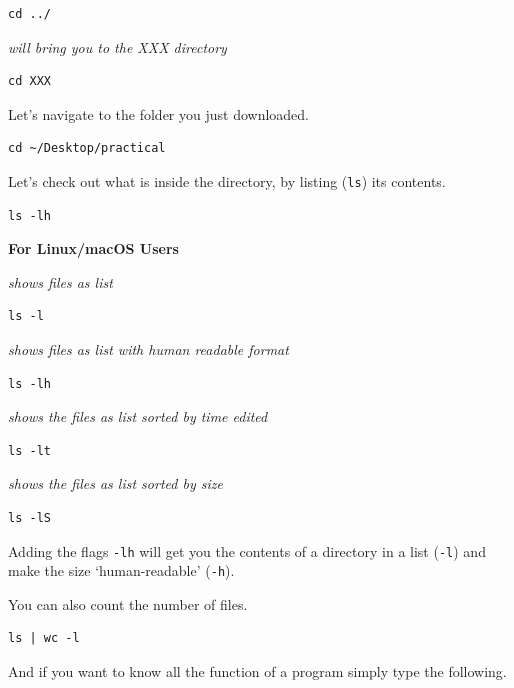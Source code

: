 \documentclass[
]{book}
\newcommand{\passthrough}[1]{#1}
\begin{document}
\begin{lstlisting}
cd ../ 
\end{lstlisting}

\emph{will bring you to the XXX directory}

\begin{lstlisting}
cd XXX 
\end{lstlisting}

Let's navigate to the folder you just downloaded.

\begin{lstlisting}
cd ~/Desktop/practical
\end{lstlisting}

Let's check out what is inside the directory, by listing (\passthrough{\lstinline!ls!}) its contents.

\begin{lstlisting}
ls -lh
\end{lstlisting}

\textbf{For Linux/macOS Users}

\emph{shows files as list}

\begin{lstlisting}
ls -l 
\end{lstlisting}

\emph{shows files as list with human readable format }

\begin{lstlisting}
ls -lh 
\end{lstlisting}

\emph{shows the files as list sorted by time edited}

\begin{lstlisting}
ls -lt 
\end{lstlisting}

\emph{shows the files as list sorted by size}

\begin{lstlisting}
ls -lS 
\end{lstlisting}

Adding the flags \passthrough{\lstinline!-lh!} will get you the contents of a directory in a list (\passthrough{\lstinline!-l!}) and make the size `human-readable' (\passthrough{\lstinline!-h!}).

You can also count the number of files.

\begin{lstlisting}
ls | wc -l
\end{lstlisting}

And if you want to know all the function of a program simply type the following.
\end{document}
